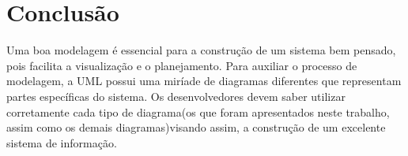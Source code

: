 \documentclass[12pt,openright,oneside,a4paper,
	chapter=TITLE,
	section=TITLE,
	english,brazil]{abntex2}
\begin{document}
\chapter{Conclusão}

Uma boa modelagem é essencial para a construção de um sistema bem pensado, pois facilita a visualização e o planejamento. Para auxiliar o processo de modelagem, a UML possui uma miríade de diagramas diferentes que representam partes específicas do sistema. Os desenvolvedores devem saber utilizar corretamente cada tipo de diagrama(os que foram apresentados neste trabalho, assim como os demais diagramas)visando assim, a construção de um excelente sistema de informação. 

\postextual


\nocite{GUEDES}
\nocite{BEZERRA}
\nocite{LARMAN}
\nocite{UML}
\end{document}
